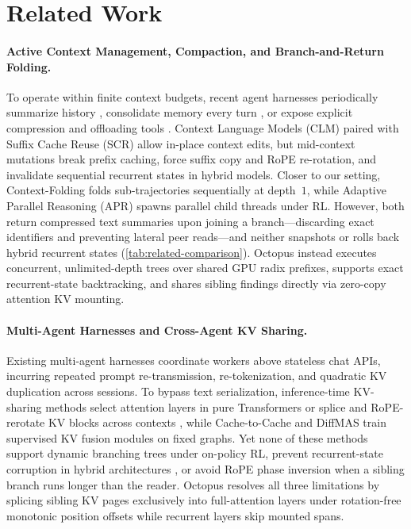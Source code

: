 \documentclass{article}
\begin{document}
\vspace{-4pt}
\section{Related Work}
\label{sec:related}
\vspace{-2pt}

\paragraph{Active Context Management, Compaction, and Branch-and-Return Folding.}
To operate within finite context budgets, recent agent harnesses periodically summarize history \citep{cassano2026cursor, wu2025resum}, consolidate memory every turn \citep{zhou2026mem1, wu2026activemem}, or expose explicit compression and offloading tools \citep{li2026selfcompact, li2026acm, li2026sculptor, zhang2025rlm, kontonis2026memento}. Context Language Models (CLM) paired with Suffix Cache Reuse (SCR) \citep{shao2026clm} allow in-place context edits, but mid-context mutations break prefix caching, force suffix copy and RoPE re-rotation, and invalidate sequential recurrent states in hybrid models. Closer to our setting, Context-Folding \citep{sun2025contextfolding} folds sub-trajectories sequentially at depth~$1$, while Adaptive Parallel Reasoning (APR) \citep{pan2025apr} spawns parallel child threads under RL. However, both return compressed text summaries upon joining a branch---discarding exact identifiers and preventing lateral peer reads---and neither snapshots or rolls back hybrid recurrent states (\cref{tab:related-comparison}). Octopus instead executes concurrent, unlimited-depth trees over shared GPU radix prefixes, supports exact recurrent-state backtracking, and shares sibling findings directly via zero-copy attention KV mounting.

\paragraph{Multi-Agent Harnesses and Cross-Agent KV Sharing.}
Existing multi-agent harnesses \citep{li2023camel, wu2023autogen, hong2023metagpt, khatua2026cooperbench} coordinate workers above stateless chat APIs, incurring repeated prompt re-transmission, re-tokenization, and quadratic KV duplication across sessions. To bypass text serialization, inference-time KV-sharing methods select attention layers in pure Transformers \citep{shi2025kvcomm} or splice and RoPE-rerotate KV blocks across contexts \citep{gim2024promptcache, yao2025cacheblend, hu2025epic, liu2024droidspeak, rodionov2025hogwild, ye2025kvcomm, jeon2026kvcmas}, while Cache-to-Cache \citep{fu2026c2c} and DiffMAS \citep{yu2026diffmas} train supervised KV fusion modules on fixed graphs. Yet none of these methods support dynamic branching trees under on-policy RL, prevent recurrent-state corruption in hybrid architectures \citep{dao2024transformers, yang2024gated, afendulev2026attention}, or avoid RoPE phase inversion when a sibling branch runs longer than the reader. Octopus resolves all three limitations by splicing sibling KV pages exclusively into full-attention layers under rotation-free monotonic position offsets while recurrent layers skip mounted spans.
\end{document}

